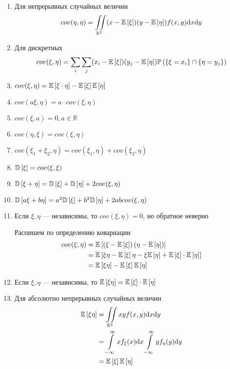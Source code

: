 \documentclass[a4paper, 10pt]{article}
\begin{document}
\begin{enumerate}
    \item Для непрерывных случайных величин $$cov(\eta,\eta)=\iint\limits_{\mathbb{R}^2}(x-\mathbb{E}\left[\xi\right])(y-\mathbb{E}\left[\eta\right])f(x,y)\text{d}x\text{d}y$$
    \item Для дискретных $$cov(\xi,\eta)=\sum_{i}\sum_{j}(x_i-\matwait{\xi})(y_j-\matwait{\eta})\twoprob{\xi=x_i}{\cap}{\eta=y_j}$$
    \item $cov(\xi,\eta)=\mathbb{E}\left[\xi\cdot\eta\right]-\mathbb{E}\left[\xi\right]\mathbb{E}\left[\eta\right]$
    \item $cov(a\xi,\eta)=a\cdot cov(\xi,\eta)$
    \item $cov(\xi,a)=0,a\in\mathbb{R}$
    \item $cov(\eta,\xi)=cov(\xi,\eta)$
    \item $cov(\xi_1+\xi_2,\eta)=cov(\xi_1,\eta)+cov(\xi_2,\eta)$
    \item $\mathbb{D}\left[\xi\right]=cov(\xi,\xi)$
    \item $\mathbb{D}\left[\xi+\eta\right]=\mathbb{D}\left[\xi\right]+\mathbb{D}\left[\eta\right]+2cov(\xi,\eta)$
    \item $\mathbb{D}\left[a\xi+b\eta\right]=a^2\mathbb{D}\left[\xi\right]+b^2\mathbb{D}\left[\eta\right]+2abcov(\xi,\eta)$
    \item Если $\xi,\eta$ — независимы, то $cov(\xi,\eta)=0$, но обратное неверно
    
    \proof Распишем по определению ковариации 
    \begin{equation*}
        \begin{aligned}
            cov(\xi,\eta)&=\mathbb{E}\left[\left(\xi-\mathbb{E}\left[\xi\right]\right)\left(\eta-\mathbb{E}\left[\eta\right]\right)\right]\\
            &=\mathbb{E}\left[\xi\eta-\mathbb{E}\left[\xi\right]\eta-\xi\mathbb{E}\left[\eta\right]+\mathbb{E}\left[\xi\right]\cdot\mathbb{E}\left[\eta\right]\right]\\
            &=\mathbb{E}\left[\xi\eta\right]-\mathbb{E}\left[\xi\right]\mathbb{E}\left[\eta\right]
        \end{aligned}
    \end{equation*}

    \item Если $\xi,\eta$ — независимы, то $\mathbb{E}\left[\xi\eta\right]=\mathbb{E}\left[\xi\right]\cdot\mathbb{E}\left[\eta\right]$
    \item Для абсолютно непрерывных случайных величин
    \begin{equation*}
        \begin{aligned}
            \mathbb{E}\left[\xi\eta\right]&=\iint\limits_{\mathbb{R}^2}xyf(x,y)\text{d}x\text{d}y\\
            &=\int\limits_{-\infty}^{\infty}xf_{\xi}(x)\text{d}x\int\limits_{-\infty}^{\infty}yf_{\eta}(y)\text{d}y\\
            &=\mathbb{E}\left[\xi\right]\mathbb{E}\left[\eta\right]
        \end{aligned}
    \end{equation*}
\end{enumerate}
\end{document}

